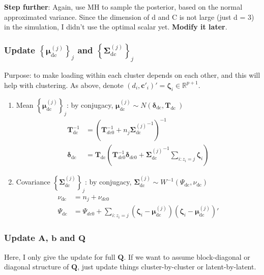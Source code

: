 \documentclass[]{article}
\begin{document}
\textbf{Step further}:
Again, use MH to sample the posterior, based on the normal approximated variance. Since the dimension of d and C is not large (just d = 3) in the simulation, I didn't use the optimal scalar yet. \textbf{Modify it later}.

\subsubsection{Update \(\left\{ \mathbf{\mu}_{\text{dc}}^{(j)} \right\}_{j}\) and \(\left\{ \mathbf{\Sigma}_{\text{dc}}^{(j)} \right\}_{j}\)} \label{loading prior}

Purpose: to make loading within each cluster depends on each other, and this will help with clustering. As above, denote \(\left( d_{i},\mathbf{c}'_{i} \right)' = \bm{\zeta}_{i} \in \mathbb{R}^{p + 1}\).
\begin{enumerate}
	\def\labelenumi{(\arabic{enumi})}
	\item
	Mean \(\left\{ \bm{\mu}_{\text{dc}}^{(j)} \right\}_{j}\): by
	conjugacy, \(\bm{\mu}_{\text{dc}}^{(j)} \sim N\left( \bm{\delta}_{\text{dc}},\mathbf{T}_{\text{dc}}\  \right)\)
	\begin{align*}
		\mathbf{T}_{\text{dc}}^{- 1} &= \left( \mathbf{T}_{dc0}^{- 1} + n_{j}{\mathbf{\Sigma}_{\text{dc}}^{(j)}}^{- 1} \right)^{- 1}\\
		\bm{\delta}_{\text{dc}} &= \mathbf{T}_{\text{dc}}\left( \mathbf{T}_{dc0}^{- 1}\bm{\delta}_{dc0} + {\mathbf{\Sigma}_{\text{dc}}^{(j)}}^{- 1}\sum_{i:z_{i} = j}^{}\bm{\zeta}_{i} \right)
	\end{align*}
	\item
	Covariance \(\left\{ \mathbf{\Sigma}_{\text{dc}}^{(j)} \right\}_{j}\): by conjugacy, \(\mathbf{\Sigma}_{\text{dc}}^{(j)} \sim W^{- 1}\left( \Psi_{\text{dc}},\nu_{\text{dc}} \right)\)
	\begin{align*}
		\nu_{\text{dc}} &= n_{j} + \nu_{dc0}\\
		\Psi_{\text{dc}} &= \Psi_{dc0} + \sum_{i:z_{i} = j}^{}{\left( \bm{\zeta}_{i} - \bm{\mu}_{\text{dc}}^{(j)} \right)\left( \bm{\zeta}_{i} - \bm{\mu}_{\text{dc}}^{(j)} \right)'}
	\end{align*}
\end{enumerate}

\subsubsection{Update \(\mathbf{A}\), \(\mathbf{b}\) and \(\mathbf{Q}\)} 
Here, I only give the update for full \(\mathbf{Q}\). If we want to assume block-diagonal or diagonal structure of \(\mathbf{Q}\), just update things cluster-by-cluster or latent-by-latent.
\end{document}

